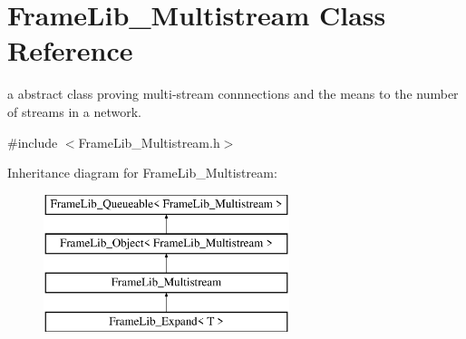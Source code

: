 \hypertarget{class_frame_lib___multistream}{}\section{Frame\+Lib\+\_\+\+Multistream Class Reference}
\label{class_frame_lib___multistream}


a abstract class proving multi-\/stream connnections and the means to the number of streams in a network.  




{\ttfamily \#include $<$Frame\+Lib\+\_\+\+Multistream.\+h$>$}

Inheritance diagram for Frame\+Lib\+\_\+\+Multistream\+:\begin{figure}[H]
\begin{center}
\leavevmode
\includegraphics[height=4.000000cm]{class_frame_lib___multistream}
\end{center}
\end{figure}
